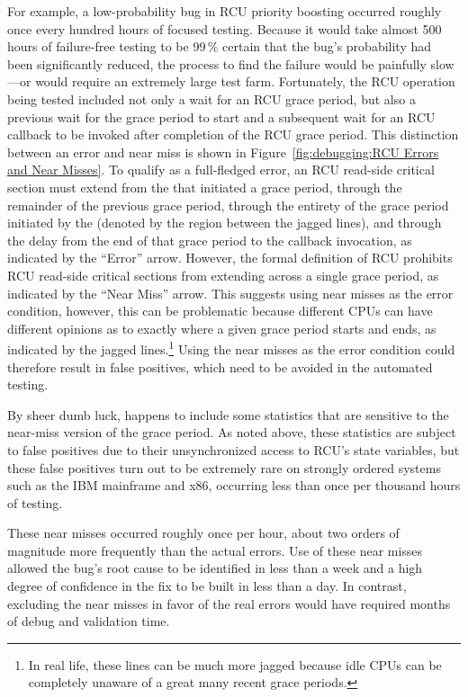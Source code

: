 For example, a low-probability bug in RCU priority boosting occurred
roughly once every hundred hours of focused  testing.
Because it would take almost 500 hours of failure-free testing to be
99\,\% certain that the bug's probability had been significantly reduced,
the  process
to find the failure would be painfully slow---or would require an extremely
large test farm.
Fortunately, the RCU operation being tested included not only a wait for
an RCU grace period, but also a previous wait for the grace period to start
and a subsequent wait for an RCU callback to be
invoked after completion of the RCU grace period.
This distinction between an  error and near miss is
shown in
Figure~\ref{fig:debugging:RCU Errors and Near Misses}.
To qualify as a full-fledged error, an RCU read-side critical section
must extend from the  that initiated a grace period,
through the remainder of the previous grace period, through the
entirety of the grace period initiated by the 
(denoted by the region between the jagged lines), and
through the delay from the end of that grace period to the callback
invocation, as indicated by the ``Error'' arrow.
However, the formal definition of RCU prohibits RCU read-side critical
sections from extending across a single grace period, as indicated by
the ``Near Miss'' arrow.
This suggests using near misses as the error condition, however, this
can be problematic because different CPUs can have different opinions
as to exactly where a given
grace period starts and ends, as indicated by the jagged lines.\footnote{
	In real life, these lines can be much more jagged because idle
	CPUs can be completely unaware of a great many recent grace
	periods.}
Using the near misses as the error condition could therefore result
in false positives, which need to be avoided in the automated
 testing.

By sheer dumb luck,  happens to include some statistics that
are sensitive to the near-miss version of the grace period.
As noted above, these statistics are subject to false positives due to
their unsynchronized access to RCU's state variables,
but these false positives turn out to be extremely rare on strongly
ordered systems such as the IBM mainframe and x86, occurring less than
once per thousand hours of testing.

These near misses occurred roughly once per hour, about two orders of
magnitude more frequently than the actual errors.
Use of these near misses allowed the bug's root cause to be identified
in less than a week and a high degree of confidence in the fix to be
built in less than a day.
In contrast, excluding the near misses in favor of the real errors would
have required months of debug and validation time.

